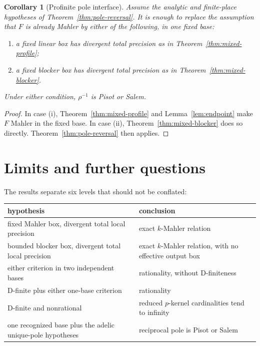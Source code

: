 \documentclass[11pt,reqno]{amsart}
\newtheorem{corollary}[theorem]{Corollary}
\theoremstyle{definition}
\theoremstyle{remark}
\begin{document}
\begin{corollary}[Profinite pole interface]\label{cor:pole-interface}
Assume the analytic and finite-place hypotheses of
Theorem~\ref{thm:pole-reversal}.  It is enough to replace the assumption
that $F$ is already Mahler by either of the following, in one fixed base:
\begin{enumerate}[label=\textup{(\roman*)}]
\item a fixed linear box has divergent total precision as in
      Theorem~\ref{thm:mixed-profile};
\item a fixed blocker box has divergent total precision as in
      Theorem~\ref{thm:mixed-blocker}.
\end{enumerate}
Under either condition, $\rho^{-1}$ is Pisot or Salem.
\end{corollary}

\begin{proof}
In case (i), Theorem~\ref{thm:mixed-profile} and
Lemma~\ref{lem:endpoint} make $F$ Mahler in the fixed base.  In case (ii),
Theorem~\ref{thm:mixed-blocker} does so directly.
Theorem~\ref{thm:pole-reversal} then applies.
\end{proof}

\clearpage
\section{Limits and further questions}

The results separate six levels that should not be conflated:
\begin{center}
\begin{tabular}{>{\raggedright\arraybackslash}p{}>{\raggedright\arraybackslash}p{}}
\toprule
hypothesis & conclusion\\
\midrule
fixed Mahler box, divergent total local precision & exact $k$-Mahler relation\\
bounded blocker box, divergent total local precision & exact $k$-Mahler relation, with no effective output box\\
either criterion in two independent bases & rationality, without D-finiteness\\
D-finite plus either one-base criterion & rationality\\
D-finite and nonrational & reduced $p$-kernel cardinalities tend to infinity\\
one recognized base plus the adelic unique-pole hypotheses & reciprocal pole is Pisot or Salem\\
\bottomrule
\end{tabular}
\end{center}
\end{document}
